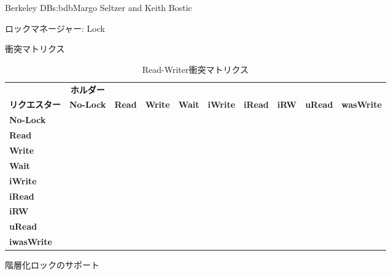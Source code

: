 \begin{aosachapter}{Berkeley DB}{s:bdb}{Margo Seltzer and Keith Bostic}
\begin{aosasect1}{ロックマネージャー: Lock}
\begin{aosasect2}{衝突マトリクス}
\begin{table}[h]\small\centering
\begin{tabular} { | l | c | c | c | c | c | c | c | c | c | }
\hline
& {\bf ホルダー} & & & & & & & & \\
{\bf リクエスター} & {\bf No-Lock}	& {\bf Read} & {\bf Write} & {\bf Wait}	& {\bf iWrite} & {\bf iRead} & {\bf iRW} & {\bf uRead} & {\bf wasWrite}\\
\hline
{\bf No-Lock}	&	&	& &	& & &	& & \\
\hline
{\bf Read}	& 		& 		& \checkmark & 		& \checkmark   & 	     & \checkmark & 	       & \checkmark\\
\hline
{\bf Write}	& 		& \checkmark	& \checkmark & \checkmark & \checkmark & \checkmark   & \checkmark & \checkmark	& \checkmark\\
\hline
{\bf Wait}	& 		& 		& 	   & 		& 	       & 	     & 	 	& 	       & \\
\hline
{\bf iWrite}	& 		& \checkmark	& \checkmark & 		& 	       & 	     & 	 	& \checkmark   & \checkmark\\
\hline
{\bf iRead}	& 		& 		& \checkmark & 		& 	       & 	     & 	 	& 	       & \checkmark\\
\hline
{\bf iRW}	& 		& \checkmark	& \checkmark & 		& 	       & 	     & 	 	& \checkmark   & \checkmark\\
\hline
{\bf uRead}	& 		& 		& \checkmark & 		& \checkmark   & 	     & \checkmark & 	       & \\
\hline
{\bf iwasWrite}	& 		& \checkmark	& \checkmark & 		& \checkmark   & \checkmark  & \checkmark & 	       & \checkmark\\
\hline
\end{tabular}
\caption{Read-Writer衝突マトリクス}
\label{tbl.bdb.two}
\end{table}

\end{aosasect2}

\begin{aosasect2}{階層化ロックのサポート}


\end{aosasect2}
\end{aosasect1}
\end{aosachapter}
